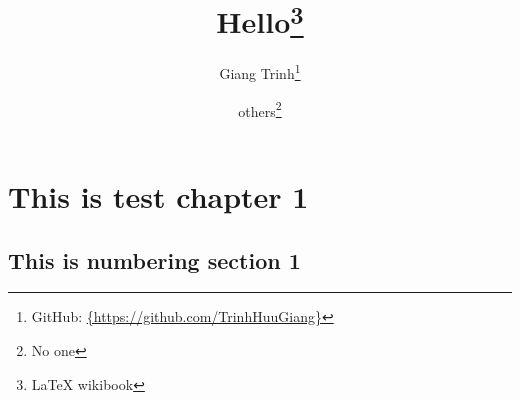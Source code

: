 \documentclass[12pt, a4paper, twoside]{report}
\begin{document}


\title{\textbf{Hello\thanks{\LaTeX {} wikibook}}}
\author{Giang Trinh\thanks{GitHub: \url{{https://github.com/TrinhHuuGiang}}}
    \and others\thanks{No one}}
\maketitle

\tableofcontents
\listoftables
\listoffigures


\chapter{This is test chapter 1}
    \label{chap: 1}
\section{This is numbering section 1}
    \label{sec: 1.1}
\end{document}
